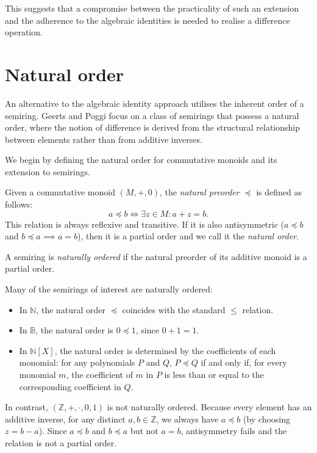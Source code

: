 \documentclass[oneside, 11pt]{amsbook}
\theoremstyle{plain}
\theoremstyle{definition}
\theoremstyle{remark}
\begin{document}
This suggests that a compromise between the practicality of such an extension and the adherence to the algebraic identities is needed to realise a difference operation.

\section{Natural order}

An alternative to the algebraic identity approach utilises the inherent order of a semiring. Geerts and Poggi \cite{Geerts2010} focus on a class of semirings that possess a natural order, where the notion of difference is derived from the structural relationship between elements rather than from additive inverses.

We begin by defining the natural order for commutative monoids and its extension to semirings.

\begin{defn}
    Given a commutative monoid $(M, +, 0)$, the \emph{natural preorder} $\preccurlyeq$ is defined as follows:
    \[
        a \preccurlyeq b \iff \exists z \in M : a + z = b.
    \]
    This relation is always reflexive and transitive. If it is also antisymmetric ($a \preccurlyeq b$ and $b \preccurlyeq a \implies a = b$), then it is a partial order and we call it the \emph{natural order}.

    A semiring is \emph{naturally ordered} if the natural preorder of its additive monoid is a partial order.
\end{defn}

\begin{exmpl}
    Many of the semirings of interest are naturally ordered:
    \begin{itemize}
        \item In $\mathbb{N}$, the natural order $\preccurlyeq$ coincides with the standard $\leq$ relation.
        \item In $\mathbb{B}$, the natural order is $0 \preccurlyeq 1$, since $0 + 1 = 1$.
        \item In $\mathbb{N}[X]$, the natural order is determined by the coefficients of each monomial: for any polynomials $P$ and $Q$, $P \preccurlyeq Q$ if and only if, for every monomial $m$, the coefficient of $m$ in $P$ is less than or equal to the corresponding coefficient in $Q$.
    \end{itemize}

    In contrast, $(\mathbb{Z}, +, \cdot, 0, 1)$ is not naturally ordered. Because every element has an additive inverse, for any distinct $a, b \in \mathbb{Z}$, we always have $a \preccurlyeq b$ (by choosing $z = b - a$). Since $a \preccurlyeq b$ and $b \preccurlyeq a$ but not $a = b$, antisymmetry fails and the relation is not a partial order.
\end{exmpl}
\end{document}
